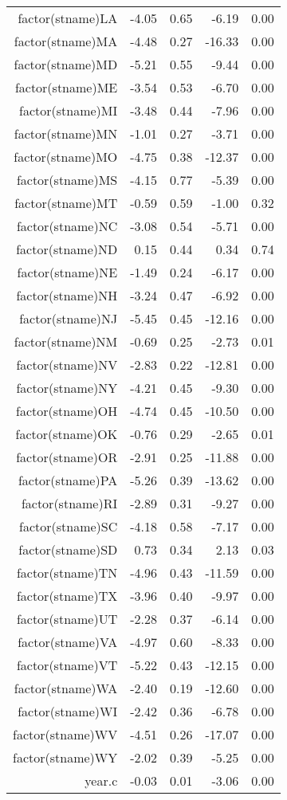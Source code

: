 \begin{table}[ht]
\begin{tabular}{rrrrr}
  factor(stname)LA & -4.05 & 0.65 & -6.19 & 0.00 \\ 
  factor(stname)MA & -4.48 & 0.27 & -16.33 & 0.00 \\ 
  factor(stname)MD & -5.21 & 0.55 & -9.44 & 0.00 \\ 
  factor(stname)ME & -3.54 & 0.53 & -6.70 & 0.00 \\ 
  factor(stname)MI & -3.48 & 0.44 & -7.96 & 0.00 \\ 
  factor(stname)MN & -1.01 & 0.27 & -3.71 & 0.00 \\ 
  factor(stname)MO & -4.75 & 0.38 & -12.37 & 0.00 \\ 
  factor(stname)MS & -4.15 & 0.77 & -5.39 & 0.00 \\ 
  factor(stname)MT & -0.59 & 0.59 & -1.00 & 0.32 \\ 
  factor(stname)NC & -3.08 & 0.54 & -5.71 & 0.00 \\ 
  factor(stname)ND & 0.15 & 0.44 & 0.34 & 0.74 \\ 
  factor(stname)NE & -1.49 & 0.24 & -6.17 & 0.00 \\ 
  factor(stname)NH & -3.24 & 0.47 & -6.92 & 0.00 \\ 
  factor(stname)NJ & -5.45 & 0.45 & -12.16 & 0.00 \\ 
  factor(stname)NM & -0.69 & 0.25 & -2.73 & 0.01 \\ 
  factor(stname)NV & -2.83 & 0.22 & -12.81 & 0.00 \\ 
  factor(stname)NY & -4.21 & 0.45 & -9.30 & 0.00 \\ 
  factor(stname)OH & -4.74 & 0.45 & -10.50 & 0.00 \\ 
  factor(stname)OK & -0.76 & 0.29 & -2.65 & 0.01 \\ 
  factor(stname)OR & -2.91 & 0.25 & -11.88 & 0.00 \\ 
  factor(stname)PA & -5.26 & 0.39 & -13.62 & 0.00 \\ 
  factor(stname)RI & -2.89 & 0.31 & -9.27 & 0.00 \\ 
  factor(stname)SC & -4.18 & 0.58 & -7.17 & 0.00 \\ 
  factor(stname)SD & 0.73 & 0.34 & 2.13 & 0.03 \\ 
  factor(stname)TN & -4.96 & 0.43 & -11.59 & 0.00 \\ 
  factor(stname)TX & -3.96 & 0.40 & -9.97 & 0.00 \\ 
  factor(stname)UT & -2.28 & 0.37 & -6.14 & 0.00 \\ 
  factor(stname)VA & -4.97 & 0.60 & -8.33 & 0.00 \\ 
  factor(stname)VT & -5.22 & 0.43 & -12.15 & 0.00 \\ 
  factor(stname)WA & -2.40 & 0.19 & -12.60 & 0.00 \\ 
  factor(stname)WI & -2.42 & 0.36 & -6.78 & 0.00 \\ 
  factor(stname)WV & -4.51 & 0.26 & -17.07 & 0.00 \\ 
  factor(stname)WY & -2.02 & 0.39 & -5.25 & 0.00 \\ 
  year.c & -0.03 & 0.01 & -3.06 & 0.00 \\ 
   \hline
\end{tabular}
\end{table}
